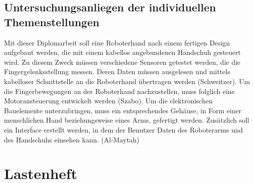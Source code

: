 \documentclass[titlepage,12pt,twoside]{article}
\begin{document}
\subsection{Untersuchungsanliegen der individuellen Themenstellungen}
\label{chap:Untersuchungsanliegen der individuellen Themenstellungen}
Mit dieser Diplomarbeit soll eine Roboterhand nach einem fertigen Design aufgebaut werden,
die mit einem kabellos angebundenen Handschuh gesteuert wird. Zu diesem Zweck müssen
verschiedene Sensoren getestet werden, die die Fingergelenksstellung messen. Deren Daten
müssen ausgelesen und mittels kabelloser Schnittstelle an die Roboterhand übertragen werden
(Schweitzer). Um die Fingerbewegungen an der Roboterhand nachzustellen, muss folglich eine
Motoransteuerung entwickelt werden (Szabo). Um die elektronischen Bauelemente
unterzubringen, muss ein entsprechendes Gehäuse, in Form einer menschlichen Hand
beziehungsweise eines Arms, gefertigt werden. Zusätzlich soll ein Interface erstellt werden, in
dem der Benutzer Daten des Roboterarms und des Handschuhs einsehen kann. (Al-Maytah) \\

\hfill \break
\hfill \break
\hfill \break
\hfill \break
\hfill \break
\hfill \break
\hfill \break
\hfill \break

\newpage
\section{Lastenheft}
\label{chap:Lastenheft}
\end{document}
